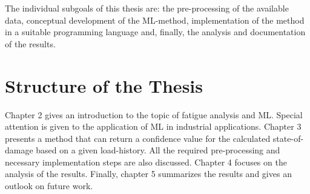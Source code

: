 The individual subgoals of this thesis are: the pre-processing of the available data, conceptual development of the ML-method, implementation of the method in a suitable programming language and, finally, the analysis and documentation of the results.

\section{Structure of the Thesis}
Chapter 2 gives an introduction to the topic of fatigue analysis and ML. Special attention is given to the application of ML in industrial applications. Chapter 3 presents a method that can return a confidence value for the calculated state-of-damage based on a given load-history. All the required pre-processing and necessary implementation steps are also discussed. Chapter 4 focuses on the analysis of the results. Finally, chapter 5 summarizes the results and gives an outlook on future work. 

